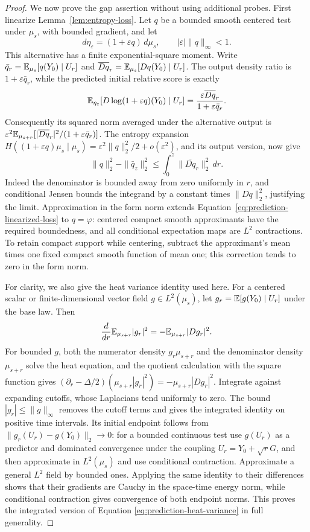 \begin{proof}
We now prove the gap assertion without using additional probes.
First linearize Lemma~\ref{lem:entropy-loss}.  Let $q$ be a bounded
smooth centered test under $\mu_s$, with bounded gradient, and let
\[
 d\eta_\varepsilon=(1+\varepsilon q)\,d\mu_s,
 \qquad |\varepsilon|\|q\|_\infty<1.
\]
This alternative has a finite exponential-square moment.  Write
$\bar q_r=\mathbb E_{\mu_s}[q(Y_0)\mid U_r]$ and
$\overline{Dq}_r=\mathbb E_{\mu_s}[Dq(Y_0)\mid U_r]$.
The output density ratio is $1+\varepsilon\bar q_r$, while the
predicted initial relative score is exactly
\[
 \mathbb E_{\eta_\varepsilon}[D\log(1+\varepsilon q)(Y_0)\mid U_r]
 =\frac{\varepsilon\overline{Dq}_r}{1+\varepsilon\bar q_r}.
\]
Consequently its squared norm averaged under the alternative output
is
$\varepsilon^2\mathbb E_{\mu_{s+r}}[|\overline{Dq}_r|^2/
(1+\varepsilon\bar q_r)]$.  The entropy expansion
$H((1+\varepsilon q)\mu_s\mid\mu_s)
=\varepsilon^2\|q\|_2^2/2+o(\varepsilon^2)$, and its output version,
now give
\begin{equation}
 \|q\|_2^2-\|\bar q_z\|_2^2
 \le\int_0^z\|\overline{Dq}_r\|_2^2\,dr.
 \label{eq:prediction-linearized-loss}
\end{equation}
Indeed the denominator is bounded away from zero uniformly in $r$,
and conditional Jensen bounds the integrand by a constant times
$\|Dq\|_2^2$, justifying the limit.  Approximation in the form norm
extends Equation~\eqref{eq:prediction-linearized-loss} to $q=\varphi$:
centered compact smooth approximants have the required boundedness,
and all conditional expectation maps are $L^2$ contractions.  To retain
compact support while centering, subtract the approximant's mean times
one fixed compact smooth function of mean one; this correction tends
to zero in the form norm.

For clarity, we also give the heat variance identity used here.  For
a centered scalar or finite-dimensional vector field $g\in L^2(\mu_s)$,
let $g_r=\mathbb E[g(Y_0)\mid U_r]$ under the base law.  Then
\begin{equation}
 \frac d{dr}\mathbb E_{\mu_{s+r}}|g_r|^2
 =-\mathbb E_{\mu_{s+r}}|Dg_r|^2.
 \label{eq:prediction-heat-variance}
\end{equation}
For bounded $g$, both the numerator density $g_r\mu_{s+r}$ and the
denominator density $\mu_{s+r}$ solve the heat equation, and the
quotient calculation with the square function gives
$(\partial_r-\Delta/2)(\mu_{s+r}|g_r|^2)
=-\mu_{s+r}|Dg_r|^2$.  Integrate against expanding cutoffs, whose
Laplacians tend uniformly to zero.  The bound
$|g_r|\le\|g\|_\infty$ removes the cutoff terms and gives the
integrated identity on positive time intervals.  Its initial endpoint
follows from $\|g_r(U_r)-g(Y_0)\|_2\to0$: for a bounded continuous
test use $g(U_r)$ as a predictor and dominated convergence under the
coupling $U_r=Y_0+\sqrt rG$, and then approximate in $L^2(\mu_s)$
and use conditional contraction.  Approximate a general $L^2$ field by bounded
ones.  Applying the same identity to their differences shows that
their gradients are Cauchy in the space-time energy norm, while
conditional contraction gives convergence of both endpoint norms.
This proves the integrated version of Equation
\eqref{eq:prediction-heat-variance} in full generality.


\end{proof}
